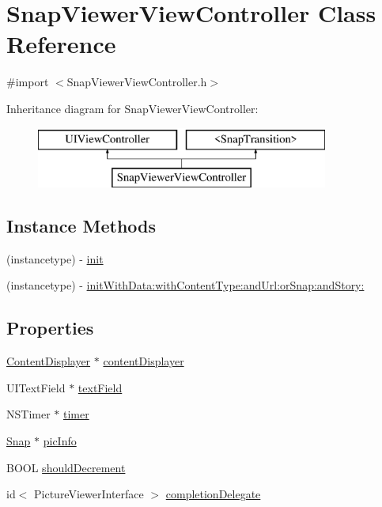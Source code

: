 \hypertarget{interface_snap_viewer_view_controller}{}\section{Snap\+Viewer\+View\+Controller Class Reference}
\label{interface_snap_viewer_view_controller}


{\ttfamily \#import $<$Snap\+Viewer\+View\+Controller.\+h$>$}

Inheritance diagram for Snap\+Viewer\+View\+Controller\+:\begin{figure}[H]
\begin{center}
\leavevmode
\includegraphics[height=2.000000cm]{interface_snap_viewer_view_controller}
\end{center}
\end{figure}
\subsection*{Instance Methods}
\begin{DoxyCompactItemize}
\item 
(instancetype) -\/ \hyperlink{interface_snap_viewer_view_controller_ae35bd2e3d57eff9a6ed5be1031eb4b0e}{init}
\item 
(instancetype) -\/ \hyperlink{interface_snap_viewer_view_controller_a1888c9ca900f5160de0e5ca706f0ecd8}{init\+With\+Data\+:with\+Content\+Type\+:and\+Url\+:or\+Snap\+:and\+Story\+:}
\end{DoxyCompactItemize}
\subsection*{Properties}
\begin{DoxyCompactItemize}
\item 
\hyperlink{interface_content_displayer}{Content\+Displayer} $\ast$ \hyperlink{interface_snap_viewer_view_controller_a098dd5e6e22df38a400ef5a3b924d983}{content\+Displayer}
\item 
U\+I\+Text\+Field $\ast$ \hyperlink{interface_snap_viewer_view_controller_a243bf0b7d697aafbca90fe98d3f74c1b}{text\+Field}
\item 
N\+S\+Timer $\ast$ \hyperlink{interface_snap_viewer_view_controller_aa4da96549115b3f0da7506889547cbe8}{timer}
\item 
\hyperlink{interface_snap}{Snap} $\ast$ \hyperlink{interface_snap_viewer_view_controller_ab20c0ba93713e93aa5456a90aafa8df1}{pic\+Info}
\item 
B\+O\+OL \hyperlink{interface_snap_viewer_view_controller_a63a8403a56f19f85adb80622a70b53e8}{should\+Decrement}
\item 
id$<$ Picture\+Viewer\+Interface $>$ \hyperlink{interface_snap_viewer_view_controller_a96acfeda350c4bdbc6b4aafc8cd17c48}{completion\+Delegate}
\end{DoxyCompactItemize}


